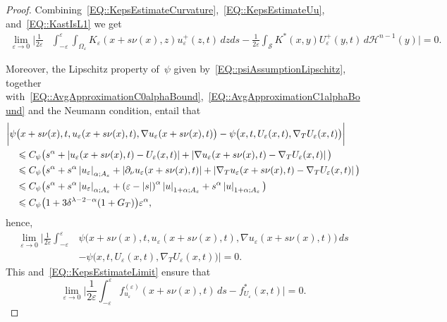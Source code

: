 \documentclass[12pt,a4paper]{amsart}
\makeatletter
\numberwithin{equation}{section}
\theoremstyle{definition}
\theoremstyle{remark}
\newcommand{\eps}{\varepsilon}
\newcommand{\abs}[1]{\left\lvert#1\right\rvert}
\renewcommand{\leq}{\leqslant}
\newcommand{\const}[1]{%
  \csname const@#1\endcsname%
}
\newcommand{\constapp}[1]{%
  \csname constapp@#1\endcsname%
}
\makeatother
\begin{document}
\begin{proof}
    Combining~\eqref{EQ::KepsEstimateCurvature},~\eqref{EQ::KepsEstimateUu}, and~\eqref{EQ::KastIsL1} we get
    \begin{align}\label{EQ::KepsEstimateLimit}
        \lim_{\eps \to 0} \bigg|\frac{1}{2\eps}&\int_{-\eps}^\eps \int_{\Omega_\eps} K_\eps(x+s\nu(x),z)u_\eps^+(z,t)\,dzds - \frac{1}{2\eps}\int_{\mathcal{S}} K^\ast(x,y)U_\eps^+(y,t)\,d\mathcal{H}^{n-1}(y)\bigg| = 0.
    \end{align}

    Moreover, the Lipschitz property of~$\psi$ given by~\eqref{EQ::psiAssumptionLipschitz}, together with~\eqref{EQ::AvgApproximationC0alphaBound},~\eqref{EQ::AvgApproximationC1alphaBound} and the Neumann condition, entail that
    \begin{align}
        \bigg|\psi&\big(x+s\nu(x),t,u_\eps(x+s\nu(x),t),\nabla u_\eps(x+s\nu(x),t)\big) - \psi\big(x,t,U_\eps(x,t),\nabla_T U_\eps(x,t)\big)\bigg|\\
            &\leq C_\psi \big(s^\alpha + \abs{u_\eps(x+s\nu(x),t)-U_\eps(x,t)} + \abs{\nabla u_\eps(x+s\nu(x),t) - \nabla_T U_\eps(x,t)}\big)\\
            &\leq C_\psi \big(s^\alpha + s^\alpha \abs{u_\eps}_{\alpha; A_\eps} + \abs{\partial_\nu u_\eps(x+s\nu(x), t)} + \abs{\nabla_T u_\eps(x+s\nu(x),t) - \nabla_T U_\eps(x,t)}\big)\\
            &\leq C_\psi \big(s^\alpha + s^\alpha \abs{u_\eps}_{\alpha; A_\eps} + {(\eps-\abs{s})}^\alpha\abs{u}_{1+\alpha; A_\eps} + s^\alpha \abs{u}_{1+\alpha; A_\eps}\big)\\
            &\leq C_\psi \big(1+3\constapp{CONST::HolderEmbeddingA}\const{CONST::UniformRegularity} \delta^{\lambda-2-\alpha} (1+G_T)\big) \eps^\alpha,
    \end{align}
    hence,
    \begin{equation}
        \begin{split}
            \lim_{\eps \to 0} \bigg|\frac{1}{2\eps}\int_{-\eps}^\eps &\psi\big(x+s\nu(x),t,u_\eps(x+s\nu(x),t),\nabla u_\eps(x+s\nu(x),t)\big)\,ds\\
                &- \psi\big(x,t,U_\eps(x,t),\nabla_T U_\eps(x,t)\big)\bigg| = 0.
        \end{split}
    \end{equation}
    This and~\eqref{EQ::KepsEstimateLimit} ensure that
    \begin{equation}\label{EQ::forceuULimit}
        \lim_{\eps \to 0} \bigg|\frac{1}{2\eps}\int_{-\eps}^\eps f_{u_\eps}^{(\eps)}(x+s\nu(x),t)\,ds - f_{U_\eps}^\ast(x,t)\bigg| = 0.
    \end{equation}


\end{proof}
\end{document}
